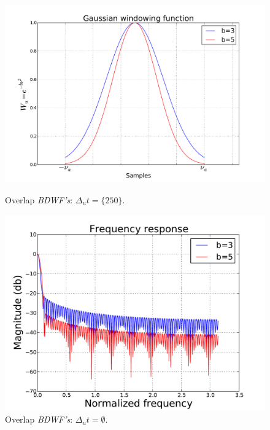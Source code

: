 \documentclass[useAMS,usenatbib]{mn2e}
\begin{document}
\begin{figure}
  \centering
\begin{minipage}{0.36\linewidth}\includegraphics[width=1\textwidth]{./Figures/gausian.pdf}\caption{Overlap 
		\textit{BDWF's}: $\Delta_u t=\{250\}$.}\label{fig:fig_4}\end{minipage}
\begin{minipage}{0.36\linewidth}\includegraphics[width=1\textwidth]{./Figures/freq_resp_gaussian.pdf}\caption{Overlap 
		\textit{BDWF's}: $\Delta_u t=\emptyset$.}\label{fig:fig_5}\end{minipage}
\end{figure}
\end{document}
